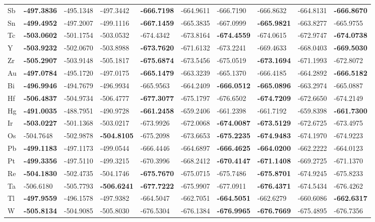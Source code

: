 \begin{table}[htbp]
{\begin{tabular}{l *{9}{l}}
      Sb & \textbf{-497.3836} & -495.1348 & -497.3442 & \textbf{-666.7198} & -664.9611 & -666.7190 & -666.8632 & -664.8131 & \textbf{-666.8670} \\
      Sn & \textbf{-499.4952} & -497.2007 & -499.1116 & \textbf{-667.1459} & -665.3835 & -667.0999 & \textbf{-665.9821} & -663.8277 & -665.9755 \\
      Tc & \textbf{-503.0602} & -501.1754 & -503.0532 & -674.4342 & -673.8164 & \textbf{-674.4559} & -674.0615 & -672.9747 & \textbf{-674.0738} \\
      Y  & \textbf{-503.9232} & -502.0670 & -503.8988 & \textbf{-673.7620} & -671.6132 & -673.2241 & -669.4633 & -668.0403 & \textbf{-669.5030} \\
      Zr & \textbf{-505.2907} & -503.9148 & -505.1817 & \textbf{-675.6874} & -673.5456 & -675.0519 & \textbf{-673.1694} & -671.1993 & -672.8072 \\
      Au & \textbf{-497.0784} & -495.1720 & -497.0175 & \textbf{-665.1479} & -663.3239 & -665.1370 & -666.4185 & -664.2892 & \textbf{-666.5182} \\
      Bi & \textbf{-496.9946} & -494.7679 & -496.9934 & -665.9563 & -664.2409 & \textbf{-666.0512} & \textbf{-665.0896} & -663.2974 & -665.0887 \\
      Hf & \textbf{-506.4837} & -504.9734 & -506.4777 & \textbf{-677.3077} & -675.1797 & -676.6502 & \textbf{-674.7209} & -672.6650 & -674.2149 \\
      Hg & \textbf{-491.0035} & -488.7951 & -490.9728 & \textbf{-661.2458} & -659.2406 & -661.2398 & -661.7192 & -659.8398 & \textbf{-661.7300} \\
      Ir & \textbf{-503.0227} & -501.1368 & -503.0217 & -673.9926 & -672.0068 & \textbf{-674.0087} & \textbf{-673.5129} & -672.6725 & -673.4975 \\
      Os & -504.7648 & -502.9878 & \textbf{-504.8105} & -675.2098 & -673.6653 & \textbf{-675.2235} & \textbf{-674.9483} & -674.1970 & -674.9223 \\
      Pb & \textbf{-499.1183} & -497.1173 & -499.0544 & -666.4446 & -664.6897 & \textbf{-666.4625} & \textbf{-664.0200} & -662.2222 & -664.0123 \\
      Pt & \textbf{-499.3356} & -497.5110 & -499.3215 & -670.3996 & -668.2412 & \textbf{-670.4147} & \textbf{-671.1408} & -669.2725 & -671.1370 \\
      Re & \textbf{-504.1830} & -502.4735 & -504.1746 & \textbf{-675.7670} & -675.0715 & -675.7486 & \textbf{-675.8701} & -674.9245 & -675.8233 \\
      Ta & -506.6180 & -505.7793 & \textbf{-506.6241} & \textbf{-677.7222} & -675.9907 & -677.0911 & \textbf{-676.4371} & -674.5434 & -676.4262 \\
      Tl & \textbf{-497.9559} & -496.1578 & -497.9382 & -664.5047 & -662.7051 & \textbf{-664.5051} & -662.6279 & -660.6086 & \textbf{-662.6317}\\
      W  & \textbf{-505.8134} & -504.9085 & -505.8030 & -676.5304 & -676.1384 & \textbf{-676.9965} & \textbf{-676.7669} & -675.4895 & -676.7356 \\
      \bottomrule
    \end{tabular}
  }


\end{table}
